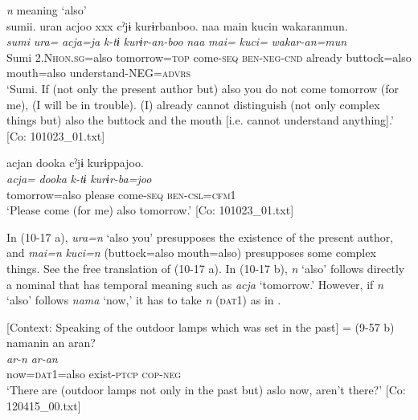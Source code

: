 \ea\label{ex:10.17}   \textit{n} meaning ‘also’\\
  \ea  %
      \glll    sumii.  uran  acjoo  xxx  cˀjɨ  kurɨrbanboo.  naa  main  kucin  wakaranmun.\\
      \textit{sumi}  \textit{ura=}  \textit{acja=ja}  {}  \textit{k-tɨ}  \textit{kurɨr-an-boo}   \textit{naa}  \textit{mai=}  \textit{kuci=}  \textit{wakar-an=mun}\\
      Sumi  2.N\textsc{hon}.\textsc{sg}=also  tomorrow=\textsc{top}  {}  come{}-\textsc{seq}  \textsc{ben}-\textsc{neg}-\textsc{cnd}    already  buttock=also  mouth=also  understand-NEG=\textsc{advrs}\\
      \glt       ‘Sumi. If (not only the present author but) also you do not come tomorrow (for me), (I will be in trouble). (I) already cannot distinguish (not only complex things but) also the buttock and the mouth [i.e. cannot understand anything].’ [Co: 101023\_01.txt]

  \ex  %
      \glll    acjan  dooka  cˀjɨ  kurɨppajoo.\\
      \textit{acja=}  \textit{dooka}  \textit{k-tɨ}  \textit{kurɨr-ba=joo}\\
      tomorrow=also  please  come-\textsc{seq}  \textsc{ben}-\textsc{csl}=\textsc{cfm}1\\
      \glt       ‘Please come (for me) also tomorrow.’ [Co: 101023\_01.txt]
    \z
\z

In (10-17 a), \textit{ura=n} ‘also you’ presupposes the existence of the present author, and \textit{mai=n} \textit{kuci=n} (buttock=also mouth=also) presupposes some complex things. See the free translation of (10-17 a). In (10-17 b), \textit{n} ‘also’ follows directly a nominal that has temporal meaning such as \textit{acja} ‘tomorrow.’ However, if \textit{n} ‘also’ follows \textit{nama} ‘now,’ it has to take \textit{n} (\textsc{dat}1) as in .

\ea\label{ex:10.18}   [Context: Speaking of the outdoor lamps which was set in the past] = (9-57 b)\\
      \glll    namanin  an  aran?\\
    \textit{}  \textit{ar-n}  \textit{ar-an}\\
    now=\textsc{dat}1=also  exist-\textsc{ptcp}  \textsc{cop}-\textsc{neg}\\
\glt     ‘There are (outdoor lamps not only in the past but) aslo now, aren’t there?’  [Co: 120415\_00.txt]
\z

